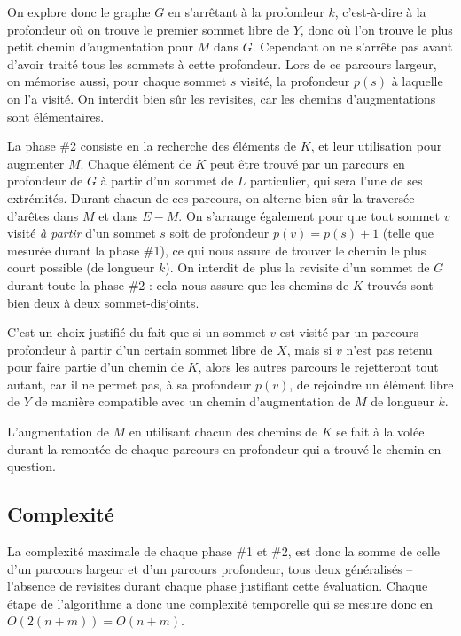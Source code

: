  On explore donc le graphe $G$ en s'arrêtant à la profondeur $k$, c'est-à-dire à la profondeur où on trouve le premier sommet libre de $Y$, donc où l'on trouve le plus petit chemin d'augmentation pour $M$ dans $G$. Cependant on ne s'arrête pas avant d'avoir traité tous les sommets à cette profondeur. Lors de ce parcours largeur, on mémorise aussi, pour chaque sommet $s$ visité, la profondeur $p(s)$ à laquelle on l'a visité. On interdit bien sûr les revisites, car les chemins d'augmentations sont élémentaires.

 La phase \#2 consiste en la recherche des éléments de $K$, et leur utilisation pour augmenter $M$. Chaque élément de $K$ peut être trouvé par un parcours en profondeur de $G$ à partir d'un sommet de $L$ particulier, qui sera l'une de ses extrémités. Durant chacun de ces parcours, on alterne bien sûr la traversée d'arêtes dans $M$ et dans $E\minus M$. On s'arrange également pour que tout sommet $v$ visité \emph{à partir} d'un sommet $s$ soit de profondeur $p(v) = p(s) + 1$ (telle que mesurée durant la phase \#1), ce qui nous assure de trouver le chemin le plus court possible (de longueur $k$). On interdit de plus la revisite d'un sommet de $G$ durant toute la phase \#2 : cela nous assure que les chemins de $K$ trouvés sont bien deux à deux sommet-disjoints.
 
 C'est un choix justifié du fait que si un sommet $v$ est visité par un parcours profondeur à partir d'un certain sommet libre de $X$, mais si $v$ n'est pas retenu pour faire partie d'un chemin de $K$, alors les autres parcours le rejetteront tout autant, car il ne permet pas, à sa profondeur $p(v)$, de rejoindre un élément libre de $Y$ de manière compatible avec un chemin d'augmentation de $M$ de longueur $k$.
 
 L'augmentation de $M$ en utilisant chacun des chemins de $K$ se fait à la volée durant la remontée de chaque parcours en profondeur qui a trouvé le chemin en question.

 \subsection{Complexité}
 
  La complexité maximale de chaque phase \#1 et \#2, est donc la somme de celle d'un parcours largeur et d'un parcours profondeur, tous deux généralisés -- l'absence de revisites durant chaque phase justifiant cette évaluation. Chaque étape de l'algorithme a donc une complexité temporelle qui se mesure donc en $O(2(n+m)) = O(n + m)$.
 
